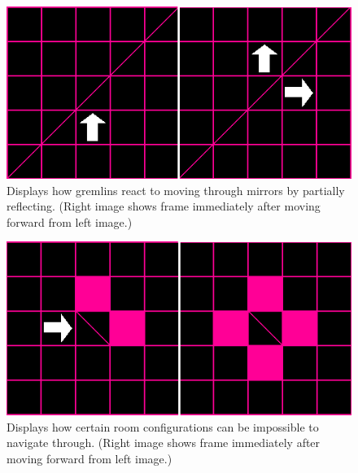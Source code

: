 \documentclass{scrreprt}
\begin{document}
		\begin{figure}[!ht]
			\centering
			\includegraphics[width=\columnwidth]{mirror}
			\caption{Displays how gremlins react to moving through mirrors by partially reflecting. (Right image shows frame immediately after moving forward from left image.)}
			\label{fig:mirror}
		\end{figure}
	
		\begin{figure}[!ht]
			\centering
			\includegraphics[width=\columnwidth]{deathtrap}
			\caption{Displays how certain room configurations can be impossible to navigate through. (Right image shows frame immediately after moving forward from left image.)}
			\label{fig:deathtrap}
		\end{figure}
	
\end{document}
